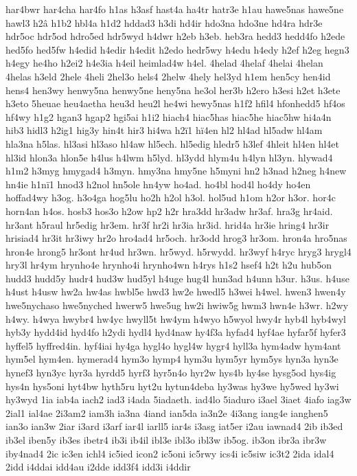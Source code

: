 {har4bwr
har4cha
har4fo
h1as
h3asf
hast4a
ha4tr
hatr3e
h1au
hawe5nas
hawe5ne
hawl3
h2â
h1b2
hbl4a
h1d2
hddad3
h3di
hd4ir
hdo3na
hdo3ne
hd4ra
hdr3e
hdr5oc
hdr5od
hdro5ed
hdr5wyd
h4dwr
h2eb
h3eb.
heb3ra
hedd3
hedd4fo
h2ede
hed5fo
hed5fw
h4edid
h4edir
h4edit
h2edo
hedr5wy
h4edu
h4edy
h2ef
h2eg
hegn3
h4egy
he4ho
h2ei2
h4e3ia
h4eil
heimlad4w
h4el.
4helad
4helaf
4helai
4helan
4helas
h3eld
2hele
4heli
2hel3o
hels4
2helw
4hely
hel3yd
h1em
hen5cy
hen4id
hens4
hen3wy
henwy5na
henwy5ne
heny5na
he3ol
her3b
h2ero
h3esi
h2et
h3ete
h3eto
5heuae
heu4aetha
heu3d
heu2l
he4wi
hewy5nas
h1f2
hfil4
hfonhedd5
hf4os
hf4wy
h1g2
hgan3
hgap2
hgi5ai
h1i2
hiach4
hiac5has
hiac5he
hiac5hw
hi4a4n
hib3
hidl3
h2ig1
hig3y
hin4t
hir3
hi4wa
h2ï1
hï4en
hl2
hl4ad
hl5adw
hl4am
hla3na
h5las.
hl3asi
hl3aso
hl4aw
hl5ech.
hl5edig
hledr5
h3lef
4hleit
hl4en
hl4et
hl3id
hlon3a
hlon5e
h4lus
h4lwm
h5lyd.
hl3ydd
hlym4u
h4lyn
hl3yn.
hlywad4
h1m2
h3myg
hmygad4
h3myn.
hmy3na
hmy5ne
h5myni
hn2
h3nad
h2neg
h4new
hn4ie
h1nï1
hnod3
h2nol
hn5ole
hn4yw
ho4ad.
ho4bl
hod4l
ho4dy
ho4en
hoffad4wy
h3og.
h3o4ga
hog5lu
ho2h
h2ol
h3ol.
hol5ud
h1om
h2or
h3or.
hor4c
horn4an
h4os.
hosb3
hos3o
h2ow
hp2
h2r
hra3dd
hr3adw
hr3af.
hra3g
hr4aid.
hr3ant
h5raul
hr5edig
hr3em.
hr3f
hr2i
hr3ia
hr3id.
hrid4a
hr3ie
hring4
hr3ir
hrisiad4
hr3it
hr3iwy
hr2o
hro4ad4
hr5och.
hr3odd
hrog3
hr3om.
hron4a
hro5nas
hron4e
hrong5
hr3ont
hr4ud
hr3wn.
hr5wyd.
h5rwydd.
hr3wyf
h4ryc
hryg3
hrygl4
hry3l
hr4ym
hrynho4e
hrynho4i
hrynho4wn
h4rys
h1s2
hsef4
h2t
h2u
hub5on
hudd3
hudd5y
hudr4
hud3w
hud5yl
h4uge
hug4l
hun3ad
h4unn
h3ur.
h3us.
h4use
h4ust
h4usw
hw2a
hw4as
hwbl5e
hwd3
hw2e
hwedl5
h3wei
h4wel.
hwen3
hwen4y
hwe5nychaso
hwe5nyched
hwerw5
hwe5ug
hw2i
hwiw5g
hwm3
hwn4e
h3wr.
h2wy
h4wy.
h4wya
hwybr4
hw4yc
hwyll5t
hw4ym
h4wyo
h5wyol
hwy4r
hyb4l
hyb4wyl
hyb3y
hydd4id
hyd4fo
h2ydi
hydl4
hyd4naw
hy4f3a
hyfad4
hyf4ae
hyfar5f
hyfer3
hyffel5
hyffred4in.
hyf4iai
hy4ga
hygl4o
hygl4w
hygr4
hyll3a
hym4adw
hym4ant
hym5el
hym4en.
hymerad4
hym3o
hymp4
hym3u
hym5yr
hym5ys
hyn3a
hyn3e
hynef3
hyn3yc
hyr3a
hyrdd5
hyrf3
hyr5n4o
hyr2w
hys4b
hy4se
hysg5od
hys4ig
hys4n
hys5oni
hyt4bw
hyth5ru
hyt2u
hytun4deba
hy3was
hy3we
hy5wed
hy3wi
hy3wyd
1ia
iab4a
iach2
iad3
i4ada
5iadaeth.
iad4lo
5iaduro
i3ael
3iaet
4iafo
iag3w
2ial1
ial4ae
2i3am2
iam3h
ia3na
4iand
ian5da
ia3n2e
4i3ang
iang4e
ianghen5
ian3o
ian3w
2iar
i3ard
i3arf
iar4l
iarll5
iar4s
i3asg
iat5er
i2au
iawnad4
2ib
ib3ed
ib3el
iben5y
ib3es
ibetr4
ib3i
ib4il
ibl3e
ibl3o
ibl3w
ib5og.
ib3on
ibr3a
ibr3w
iby4nad4
2ic
ic3en
ichl4
ic5ied
icon2
ic5oni
ic5rwy
ics4i
ic5siw
ic3t2
2ida
idal4
2idd
i4ddai
idd4au
i2dde
idd3f4
idd3i
i4ddir
}
